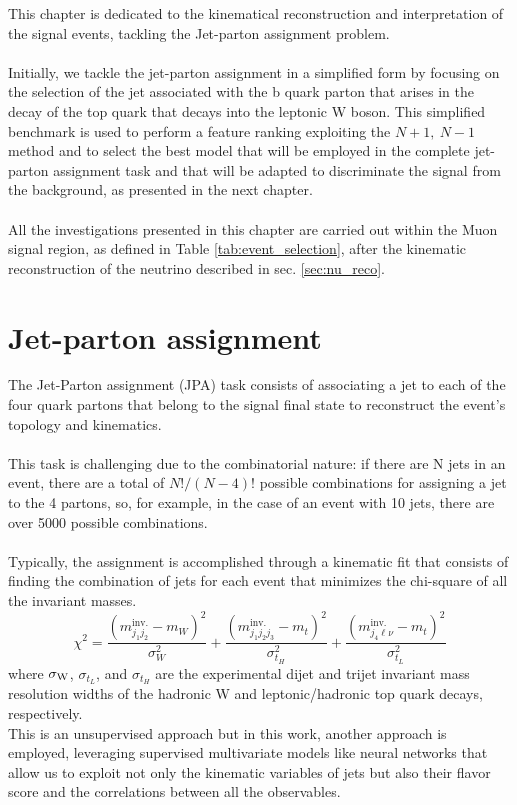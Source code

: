 \label{sec:kin}
\vspace{-1cm}
\minitoc
\vspace{0.5cm}
This chapter is dedicated to the kinematical reconstruction and interpretation of the signal events, tackling the Jet-parton assignment problem.
\\
\\
Initially, we tackle the jet-parton assignment in a simplified form by focusing on the selection of the jet associated with the b quark parton that arises in the decay of the top quark that decays into the leptonic W boson. This simplified benchmark is used to perform a feature ranking exploiting the $N+1,\: N-1$ method and to select the best model that will be employed in the complete jet-parton assignment task and that will be adapted to discriminate the signal from the background, as presented in the next chapter.
\\
\\
All the investigations presented in this chapter are carried out within the Muon signal region, as defined in Table \ref{tab:event_selection}, after the kinematic reconstruction of the neutrino described in sec. \ref{sec:nu_reco}.\\

\section{Jet-parton assignment}
The Jet-Parton assignment (JPA) task consists of associating a jet to each of the four quark partons that belong to the signal final state to reconstruct the event's topology and kinematics.\\
\\
This task is challenging due to the combinatorial nature: if there are N jets in an event, there are a total of $N!/(N-4)!$ possible combinations for assigning a jet to the 4 partons, so, for example, in the case of an event with 10 jets, there are over 5000 possible combinations.\\
\\
Typically, the assignment is accomplished through a kinematic fit that consists of finding the combination of jets for each event that minimizes the chi-square of all the invariant masses.
\begin{equation}
    \chi^2=\frac{(m_{j_1j_2}^{\text{inv.}}-m_W)^2}{\sigma^2_W}+\frac{(m_{j_1j_2j_3}^{\text{inv.}}-m_t)^2}{\sigma^2_{t_H}}+\frac{(m_{j_4\ell\nu}^{\text{inv.}}-m_t)^2}{\sigma^2_{t_L}}
\end{equation}
where $\sigma_{\text{W}}$, $\sigma_{t_L}$, and $\sigma_{t_H}$ are the experimental dijet and trijet invariant mass resolution widths of the hadronic W and leptonic/hadronic top quark decays, respectively.\\
This is an unsupervised approach but in this work, another approach is employed, leveraging supervised multivariate models like neural networks that allow us to exploit not only the kinematic variables of jets but also their flavor score and the correlations between all the observables.


